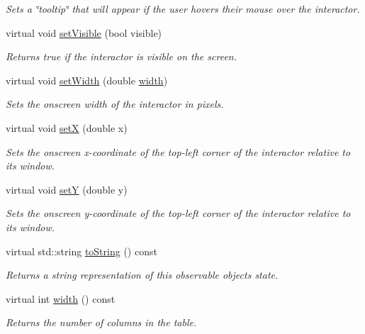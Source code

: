 \begin{DoxyCompactItemize}
\begin{DoxyCompactList}\small\item\em Sets a \char`\"{}tooltip\char`\"{} that will appear if the user hovers their mouse over the interactor. \end{DoxyCompactList}\item 
virtual void \mbox{\hyperlink{classGInteractor_a18e44e30b31525a243960ca3928125aa}{set\+Visible}} (bool visible)
\begin{DoxyCompactList}\small\item\em Returns true if the interactor is visible on the screen. \end{DoxyCompactList}\item 
virtual void \mbox{\hyperlink{classGInteractor_aa3f3fba4cb131baa8696ba01e3bceca1}{set\+Width}} (double \mbox{\hyperlink{classGTable_ad72663daf610f2a0833a2fc3d78e4fdf}{width}})
\begin{DoxyCompactList}\small\item\em Sets the onscreen width of the interactor in pixels. \end{DoxyCompactList}\item 
virtual void \mbox{\hyperlink{classGInteractor_a9c18fcc579333bf9653d13ad2b372e39}{setX}} (double x)
\begin{DoxyCompactList}\small\item\em Sets the onscreen x-\/coordinate of the top-\/left corner of the interactor relative to its window. \end{DoxyCompactList}\item 
virtual void \mbox{\hyperlink{classGInteractor_a7d57e2a5c35d27feb58fd498a3cf82b9}{setY}} (double y)
\begin{DoxyCompactList}\small\item\em Sets the onscreen y-\/coordinate of the top-\/left corner of the interactor relative to its window. \end{DoxyCompactList}\item 
virtual std\+::string \mbox{\hyperlink{classGObservable_a1fe5121d6528fdea3f243321b3fa3a49}{to\+String}} () const
\begin{DoxyCompactList}\small\item\em Returns a string representation of this observable object\textquotesingle{}s state. \end{DoxyCompactList}\item 
virtual int \mbox{\hyperlink{classGTable_ad72663daf610f2a0833a2fc3d78e4fdf}{width}} () const
\begin{DoxyCompactList}\small\item\em Returns the number of columns in the table. \end{DoxyCompactList}\end{DoxyCompactItemize}

